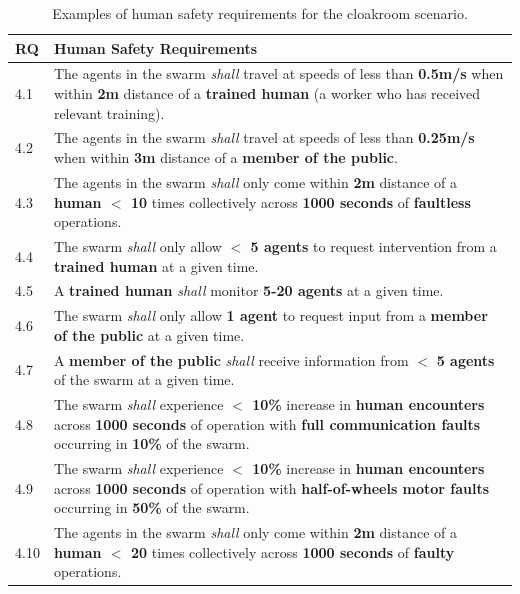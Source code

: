 \documentclass[runningheads]{llncs}
\begin{document}
\begin{table}[!h]
	\centering
	\begin{tabular}{p{6mm} p{116mm}}
		RQ & \textbf{Human Safety Requirements} \\
		\hline
		4.1 & The agents in the swarm \emph{shall} travel at speeds of less than \textbf{0.5m/s} when within \textbf{2m} distance of a \textbf{trained human} (a worker who has received relevant training).
		\\ 
		\hline
		4.2 & The agents in the swarm \emph{shall} travel at speeds of less than \textbf{0.25m/s} when within \textbf{3m} distance of a \textbf{member of the public}.
		\\ 
		\hline
		4.3 & The agents in the swarm \emph{shall} only come within \textbf{2m} distance of a \textbf{human $<$ 10} times collectively across \textbf{1000 seconds} of \textbf{faultless} operations.
		\\ 
		\hline
		4.4 & The swarm \emph{shall} only allow \textbf{$<$ 5 agents} to request intervention from a \textbf{trained human} at a given time.
		\\ 
		\hline
		4.5 & A \textbf{trained human} \emph{shall} monitor \textbf{5-20 agents} at a given time.
		\\ 
		\hline
		4.6 & The swarm \emph{shall} only allow \textbf{1 agent} to request input from a \textbf{member of the public} at a given time.
		\\ 
		\hline
		4.7 & A \textbf{member of the public} \emph{shall} receive  information from $<$ \textbf{5 agents} of the swarm at a given time.
		\\ 
		\hline
		4.8 & The swarm \emph{shall} experience \textbf{$<$ 10\%} increase in \textbf{human encounters} across \textbf{1000 seconds} of operation with \textbf{full communication faults} occurring in \textbf{10\%} of the swarm. \\
		\hline
		4.9 & The swarm \emph{shall} experience \textbf{$<$ 10\%} increase in \textbf{human encounters }across \textbf{1000 seconds} of operation with \textbf{half-of-wheels motor faults} occurring in \textbf{50\%} of the swarm.\\
		\hline
		4.10 & The agents in the swarm \emph{shall} only come within \textbf{2m} distance of a \textbf{human $<$ 20} times collectively across \textbf{1000 seconds} of \textbf{faulty} operations.
		\\		[1ex] 		
		\hline
	\end{tabular}
	\caption{\label{tab:human-s}Examples of human safety requirements for the cloakroom scenario.}
	\vspace{-4ex}
\end{table}   
\end{document}
